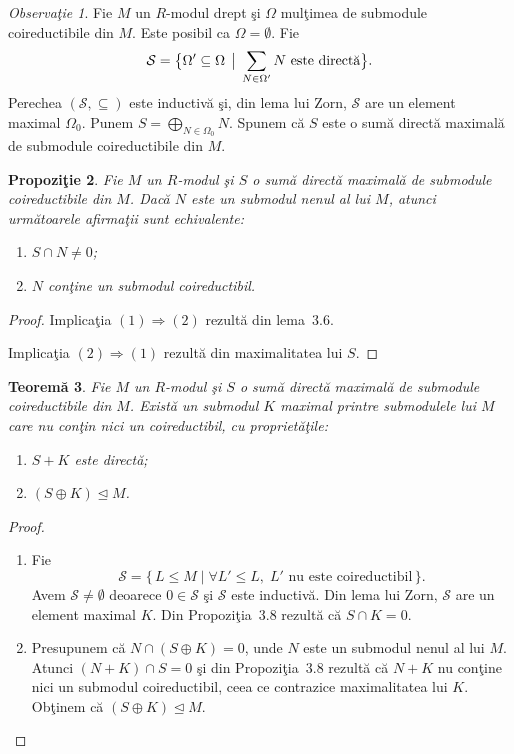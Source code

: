 \documentclass[12pt,a4paper]{book}
\newcommand{\ess}{\trianglelefteq}  %
\theoremstyle{plain}
\newtheorem{theorem}{Teoremă}[section] %
\newtheorem{proposition}[theorem]{Propoziţie}
\theoremstyle{definition}
\theoremstyle{remark}
\newtheorem{remark}[theorem]{Observaţie}
\begin{document}
\begin{remark}
Fie $M$ un $R$-modul drept şi $\Omega$ mulţimea de submodule
coireductibile din $M$. Este posibil ca $\Omega = \emptyset$.
Fie
\[
\mathcal{S} = \bigl\{\Omega' \subseteq \Omega \,\bigm|\, \sum_{N \in \Omega'}
N \text{ este directă} \bigr\}.
\]
Perechea $(\mathcal{S},\subseteq)$ este inductivă şi, din lema lui Zorn,
$\mathcal{S}$ are un element maximal $\Omega_0$.
Punem $S = \bigoplus_{N \in \Omega_0} N$.
Spunem că $S$ este o sumă directă maximală de submodule
coireductibile din $M$.
\end{remark}

\begin{proposition}
Fie $M$ un $R$-modul şi $S$ o sumă directă maximală de submodule
coireductibile din $M$. Dacă $N$ este un submodul nenul al lui $M$,
atunci următoarele afirmaţii sunt echivalente:
\begin{enumerate}
  \item $S \cap N \neq 0$;
  \item $N$ conţine un submodul coireductibil.
\end{enumerate}
\end{proposition}

\begin{proof}
Implicaţia \((1)\Rightarrow(2)\) rezultă din lema~3.6.

Implicaţia \((2)\Rightarrow(1)\) rezultă din maximalitatea lui $S$.
\end{proof}

\begin{theorem}
Fie $M$ un $R$-modul şi $S$ o sumă directă maximală de submodule
coireductibile din $M$. Există un submodul $K$ maximal printre
submodulele lui $M$ care nu conţin nici un coireductibil, cu
proprietăţile:
\begin{enumerate}
  \item $S + K$ este directă;
  \item $(S \oplus K) \ess M$.
\end{enumerate}
\end{theorem}

\begin{proof}
\begin{enumerate}
\item Fie
\[
\mathcal{S} = \{\,L \leq M \mid \forall L' \leq L,\; L' \text{ nu este
coireductibil}\,\}.
\]
Avem $\mathcal{S} \neq \emptyset$ deoarece $0 \in \mathcal{S}$ şi
$\mathcal{S}$ este inductivă. Din lema lui Zorn, $\mathcal{S}$ are un
element maximal $K$. Din Propoziţia~3.8 rezultă că $S \cap K = 0$.

\item Presupunem că $N \cap (S \oplus K) = 0$, unde $N$ este un
submodul nenul al lui $M$. Atunci $(N + K) \cap S = 0$ şi din
Propoziţia~3.8 rezultă că $N + K$ nu conţine nici un submodul
coireductibil, ceea ce contrazice maximalitatea lui $K$.
Obţinem că $(S \oplus K) \ess M$.
\end{enumerate}
\end{proof}
\end{document}
